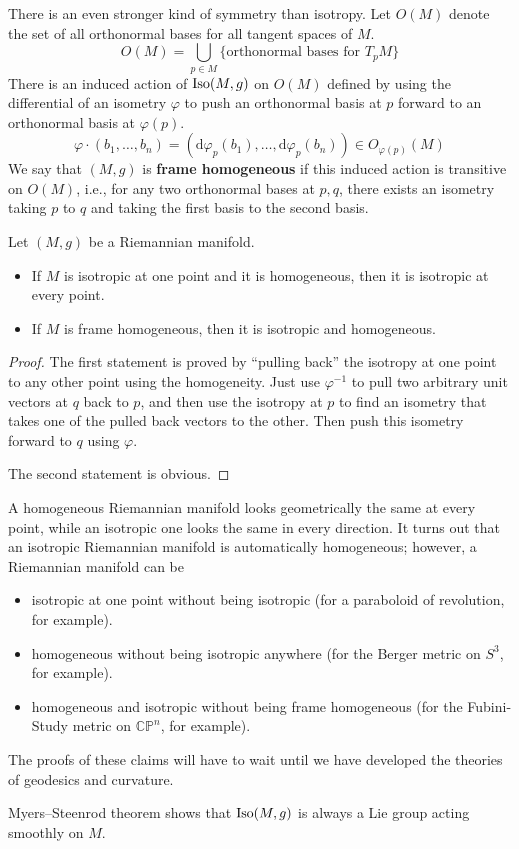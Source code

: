 \documentclass[../main.tex]{subfiles}
\begin{document}
There is an even stronger kind of symmetry than isotropy. Let $O(M)$ denote the set of all orthonormal bases for all tangent spaces of $M$.
\begin{equation}
	O(M) = \bigcup_{p \in M} \{ \text{orthonormal bases for } T_p M \}
\end{equation}
There is an induced action of $\operatorname{Iso}(M,g)$ on $O(M)$ defined by using the differential of an isometry $\varphi$ to push an orthonormal basis at $p$ forward to an orthonormal basis at $\varphi(p)$.
\begin{equation}
	\varphi \cdot (b_1, \ldots, b_n) = (\mathrm{d} \varphi_p(b_1), \ldots, \mathrm{d} \varphi_p(b_n)) \in O_{\varphi(p)}(M)
\end{equation}
We say that $(M,g)$ is \textbf{frame homogeneous} if this induced action is transitive on $O(M)$, i.e., for any two orthonormal bases at $p,q$, there exists an isometry taking $p$ to $q$ and taking the first basis to the second basis.

\begin{proposition}{}{}
	Let $(M,g)$ be a Riemannian manifold.
	\begin{itemize}
		\item If $M$ is isotropic at one point and it is homogeneous, then it is isotropic at every point.
		\item If $M$ is frame homogeneous, then it is isotropic and homogeneous.
	\end{itemize}
\end{proposition}
\begin{proof}
	The first statement is proved by ``pulling back'' the isotropy at one point to any other point using the homogeneity. Just use $\varphi^{-1}$ to pull two arbitrary unit vectors at $q$ back to $p$, and then use the isotropy at $p$ to find an isometry that takes one of the pulled back vectors to the other. Then push this isometry forward to $q$ using $\varphi$.

	The second statement is obvious.
\end{proof}

\begin{remark}
	A homogeneous Riemannian manifold looks geometrically the same at every point, while an isotropic one looks the same in every direction. It turns out that an isotropic Riemannian manifold is automatically homogeneous; however, a Riemannian manifold can be
	\begin{itemize}
		\item isotropic at one point without being isotropic (for a paraboloid of revolution, for example).
		\item homogeneous without being isotropic anywhere (for the Berger metric on $S^3$, for example).
		\item homogeneous and isotropic without being frame homogeneous (for the Fubini-Study metric on $\mathbb{CP}^n$, for example).
	\end{itemize}
	The proofs of these claims will have to wait until we have developed the theories of geodesics and curvature.
\end{remark}
Myers–Steenrod theorem shows that $\operatorname{Iso}(M,g)$ is always a Lie group acting smoothly on $M$.
\end{document}
